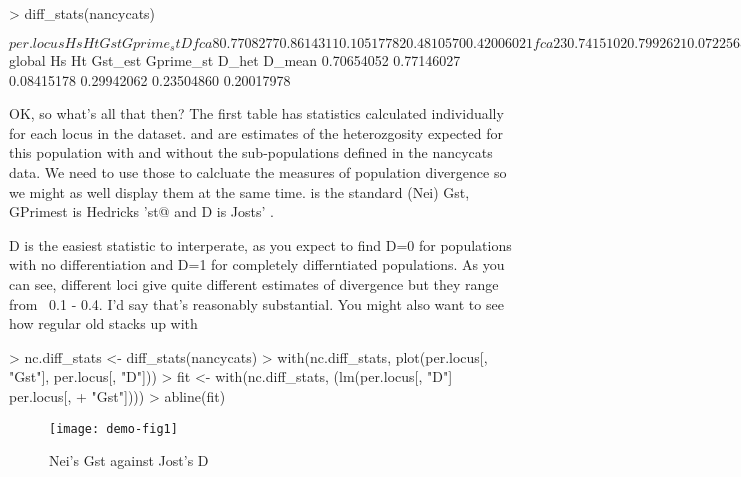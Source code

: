 \documentclass{article}
\begin{document}
\begin{Schunk}
\begin{Sinput}
> diff_stats(nancycats)
\end{Sinput}
\begin{Soutput}
$per.locus
             Hs        Ht        Gst Gprime_st          D
fca8  0.7708277 0.8614311 0.10517782 0.4810570 0.42006021
fca23 0.7415102 0.7992621 0.07225650 0.2924881 0.23738411
fca43 0.7416796 0.7935120 0.06532017 0.2645865 0.21319208
fca45 0.7273320 0.7641204 0.04814486 0.1845960 0.14335289
fca77 0.7766369 0.8655618 0.10273670 0.4822798 0.42300076
fca78 0.6316202 0.6772045 0.06731245 0.1899390 0.13147655
fca90 0.7369587 0.8141591 0.09482221 0.3770880 0.31183460
fca96 0.6699736 0.7654561 0.12473941 0.3937947 0.30740024
fca37 0.5623259 0.6024354 0.06657894 0.1574662 0.09737005

$global
        Hs         Ht    Gst_est  Gprime_st      D_het     D_mean 
0.70654052 0.77146027 0.08415178 0.29942062 0.23504860 0.20017978 
\end{Soutput}
\end{Schunk}


OK, so what's all that then? The first table has statistics calculated individually 
for each locus in the dataset. \verb@Hs@ and \verb@Hs@ are estimates of the 
heterozgosity expected for this population with and without the sub-populations
defined in the nancycats data. We need to use those to calcluate the measures of 
population divergence so we might as well display them at the same time. 
\verb@Gst@ is the standard (Nei) Gst, GPrimest is Hedricks \verb@G'st@ and D 
 is Josts' \verb@D@.
\par D is the easiest statistic to interperate, as you expect to find D=0 for
populations with no differentiation and D=1 for completely differntiated 
populations. As you can see, different loci give quite different estimates of
divergence but they range from ~0.1 - 0.4. I'd say that's reasonably 
substantial. You might also want to see how regular old \verb@Gst@ stacks up
with \verb@D@
\begin{Schunk}
\begin{Sinput}
> nc.diff_stats <- diff_stats(nancycats)
> with(nc.diff_stats, plot(per.locus[, "Gst"], per.locus[, "D"]))
> fit <- with(nc.diff_stats, (lm(per.locus[, "D"] ~ per.locus[, 
+     "Gst"])))
> abline(fit)
\end{Sinput}
\end{Schunk}
\begin{figure}
\begin{center}
\texttt{[image: demo-fig1]}
\end{center}
\label{Gst v D}
\caption{Nei's Gst against Jost's D}
\end{figure}
\end{document}
